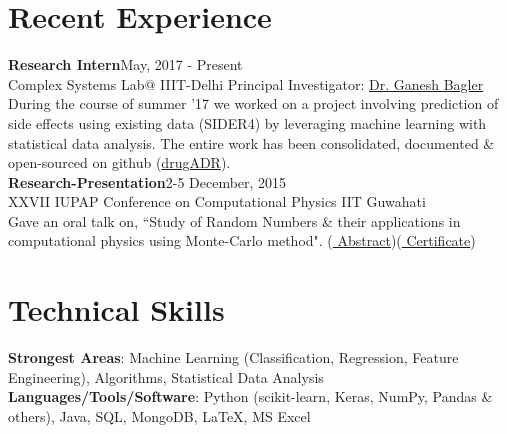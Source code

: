 \documentclass[margin,line]{res}
\begin{document}
\begin{resume}
\section{\sc Recent Experience}
{\bf Research Intern}\hfill May, 2017 - Present\\  
Complex Systems Lab@ IIIT-Delhi \hfill Principal Investigator: {\href{https://scholar.google.co.in/citations?user=qyth_0QAAAAJ&hl=en}{\color{blue} Dr. Ganesh Bagler}}\\
During the course of summer '17 we worked on a project involving prediction of side effects using existing data (SIDER4) by leveraging machine learning with statistical data analysis. The entire work has been consolidated, documented \& open-sourced on github ({\href{https://github.com/sominwadhwa/drugADR}{\color{blue}drugADR}}). \\
{\bf Research-Presentation}\hfill 2-5 December, 2015\\
XXVII IUPAP Conference on Computational Physics {\hfill}IIT Guwahati\\
Gave an oral talk on, ``Study of Random Numbers \& their applications in computational physics using Monte-Carlo method". ({\href{https://drive.google.com/open?id=0B8hsJozmBILETlV3VVQ3S21NLTg}{\color{blue} Abstract}})({\href{https://drive.google.com/open?id=0B8hsJozmBILEcGRiT2VzZ0hFUEE}{\color{blue} Certificate}})

\section{\sc Technical Skills}
{\bf Strongest Areas}: Machine Learning (Classification, Regression, Feature Engineering), Algorithms, Statistical Data Analysis\\
{\bf Languages/Tools/Software}: Python (scikit-learn, Keras, NumPy, Pandas \& others), Java, SQL, MongoDB, \LaTeX, MS Excel


\end{resume}
\end{document}
